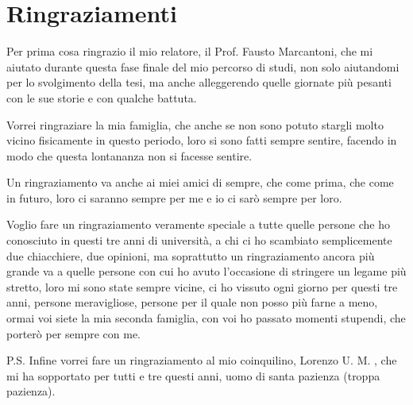 \chapter*{Ringraziamenti}

Per prima cosa ringrazio il mio relatore, il Prof. Fausto Marcantoni, che mi aiutato durante questa fase finale del mio percorso di studi, non solo aiutandomi per lo svolgimento della tesi, ma anche alleggerendo quelle giornate più pesanti con le sue storie e con qualche battuta.

Vorrei ringraziare la mia famiglia, che anche se non sono potuto stargli molto vicino fisicamente in questo periodo, loro si sono fatti sempre sentire, facendo in modo che questa lontananza non si facesse sentire.

Un ringraziamento va anche ai miei amici di sempre, che come prima, che come in futuro, loro ci saranno sempre per me e io ci sarò sempre per loro.

Voglio fare un ringraziamento veramente speciale a tutte quelle persone che ho conosciuto in questi tre anni di università, a chi ci ho scambiato semplicemente due chiacchiere, due opinioni, ma soprattutto un ringraziamento ancora più grande va a quelle persone con cui ho avuto l'occasione di stringere un legame più stretto, loro mi sono state sempre vicine, ci ho vissuto ogni giorno per questi tre anni, persone meravigliose, persone per il quale non posso più farne a meno, ormai voi siete la mia seconda famiglia, con voi ho passato momenti stupendi, che porterò per sempre con me.

P.S. Infine vorrei fare un ringraziamento al mio coinquilino, Lorenzo U. M. , che mi ha sopportato per tutti e tre questi anni, uomo di santa pazienza (troppa pazienza).